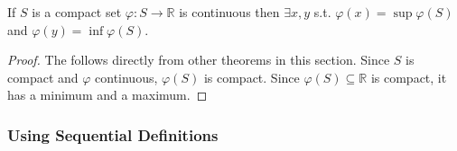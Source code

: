 \documentclass{article}
\begin{document}
\begin{theorem}\label{thm:lecture3_continuity_weierstrass_evt}
  If $S$ is a compact set $\varphi: S \to \mathbb{R}$ is continuous then $\exists x, y$ s.t. $\varphi(x) = \sup \varphi(S)$ and $\varphi(y) = \inf \varphi(S)$.
\end{theorem}

\begin{proof}
  The  follows directly from other theorems in this section. Since $S$ is compact and $\varphi$ continuous, $\varphi(S)$ is compact. Since $\varphi(S) \subseteq \mathbb{R}$ is compact, it has a minimum and a maximum.
\end{proof}

\subsubsection{Using Sequential Definitions}
\label{ssub:using_sequential_definitions}
\end{document}

